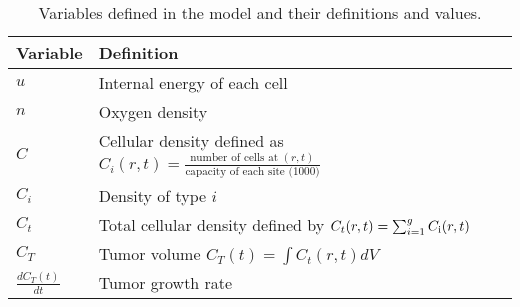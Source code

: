 \documentclass[aps,prl, superscriptaddress,groupedaddress]{revtex4}  %
\begin{document}
	\begin{table}[h]
		\centering
		\caption{ Variables defined in the model and their definitions and values. }
		\setlength{\arrayrulewidth}{0.1mm}
		\setlength{\tabcolsep}{15pt}
		\renewcommand{\arraystretch}{0.8}	
		\begin{tabular}{|p{1.0cm}|p{10cm}|}
			\hline
			Variable & Definition   \\
			\hline
			$u$  & Internal energy of each cell \\ 
			\hline
			$n$  & Oxygen density \\ 
			\hline 
			$C$  & Cellular density defined as $C_i(r,t)=\frac{\text{number of cells  at}\;(r,t)}{\text{capacity of each site (1000)}}$ \\ 
			\hline
			$C_i$  & Density of type $i$  \\ 
			\hline
			$C_t$  & Total  cellular density defined by $C_t(r,t) =\sum^g_{i=1} C_{\rm i}(r,t)$  \\ 
			\hline
			$C_T$  & Tumor volume  $C_T(t)=\int C_t(r,t)dV$  \\ 
			\hline
			$\frac{d C_T(t)}{d t} $ & Tumor growth rate \\ 
			\hline 
		\end{tabular}
	\end{table} 
\end{document}
